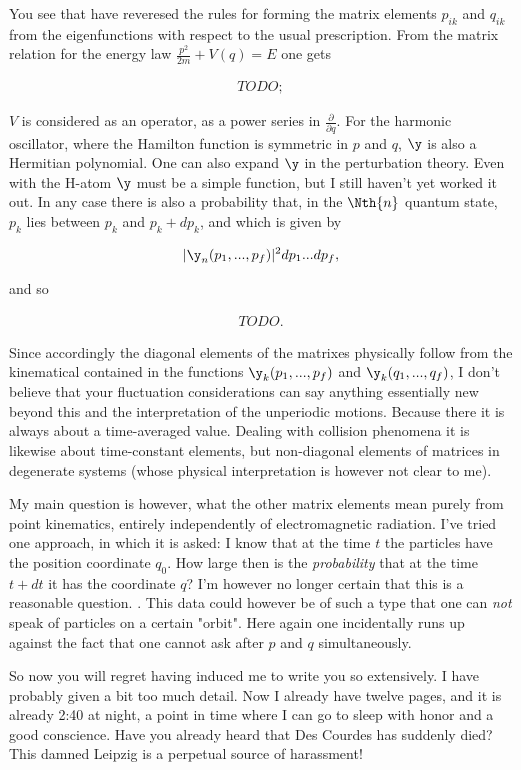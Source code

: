 \documentclass{article}
\newcommand{\uequ}[1]{
\begin{align*}
#1
\end{align*}
}
\begin{document}
You see that have reveresed the rules for forming the matrix elements $p_{ik}$ and $q_{ik}$ from the eigenfunctions with respect to the usual prescription. From the matrix relation for the energy law $\frac{p^2}{2m}+V(q)=E$ one gets
\uequ{
TODO;
}
$V$ is considered as an operator, as a power series in $\frac{\partial}{\partial q}$. For the harmonic oscillator, where the Hamilton function is symmetric in $p$ and $q$, $\y$ is also a Hermitian polynomial. One can also expand $\y$ in the perturbation theory. Even with the H-atom $\y$ must be a simple function, but I still haven't yet worked it out. In any case there is also a probability that, in the $\Nth{n}$ quantum state, $p_k$ lies between $p_k$ and $p_k+dp_k$, and which is given by
\uequ{
|\y_n(p_1,...,p_f)|^2 dp_1...dp_f,
}
and so
\uequ{
TODO.
}
Since accordingly the diagonal elements of the matrixes physically follow from the kinematical  contained in the functions $\y_k(p_1,...,p_f)$ and $\y_k(q_1,...,q_f)$, I don't believe that your fluctuation considerations can say anything essentially new beyond this and the interpretation of the unperiodic motions. Because there it is always about a time-averaged value. Dealing with collision phenomena it is likewise about time-constant elements, but non-diagonal elements of matrices in degenerate systems (whose physical interpretation is however not clear to me).

My main question is however, what the other matrix elements mean purely from point kinematics, entirely independently of electromagnetic radiation. I've tried one approach, in which it is asked: I know that at the time $t$ the particles have the position coordinate $q_0$. How large then is the \textit{probability} that at the time $t+dt$ it has the coordinate $q$? I'm however no longer certain that this is a reasonable question. . This data could however be of such a type that one can \textit{not} speak of particles on a certain "orbit". Here again one incidentally runs up against the fact that one cannot ask after $p$ and $q$ simultaneously.

So now you will regret having induced me to write you so extensively. I have probably given a bit too much detail. Now I already have twelve pages, and it is already 2:40 at night, a point in time where I can go to sleep with honor and a good conscience. Have you already heard that Des Courdes has suddenly died? This damned Leipzig is a perpetual source of harassment!
\end{document}
